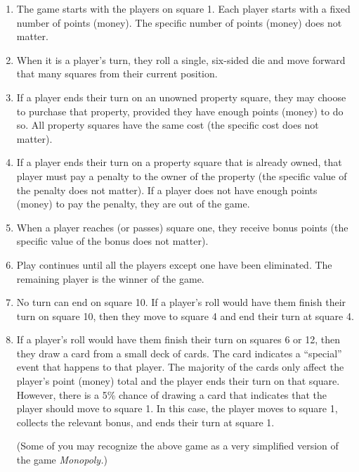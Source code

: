 \documentclass[fleqn]{article}
\begin{document}
\begin{enumerate}[nolistsep]
		\begin{enumerate}
			\item The game starts with the players on square 1. Each player starts with a fixed number of points (money). The specific number of points (money) does not matter.
			
			\item When it is a player’s turn, they roll a single, six-sided die and move forward that many squares from their current position.

			\item If a player ends their turn on an unowned property square, they may choose to purchase that property, provided they have enough points (money) to do so. All property squares have the same cost (the specific cost does not matter).

			\item If a player ends their turn on a property square that is already owned, that player must pay a penalty to the owner of the property (the specific value of the penalty does not matter). If a player does not have enough points (money) to pay the penalty, they are out of the game.
			
			\item When a player reaches (or passes) square one, they receive bonus points (the specific value of the bonus does not matter).

			\item Play continues until all the players except one have been eliminated. The remaining player is the winner of the game.

			\item No turn can end on square 10. If a player’s roll would have them finish their turn on square 10, then they move to square 4 and end their turn at square 4.

			\item If a player’s roll would have them finish their turn on squares 6 or 12, then they draw a card from a small deck of cards. The card indicates a “special” event that happens to that player. The majority of the cards only affect the player’s point (money) total and the player ends their turn on that square. However, there is a 5\% chance of drawing a card that indicates that the player should move to square 1. In this case, the player moves to square 1, collects the relevant bonus, and ends their turn at square 1.

			(Some of you may recognize the above game as a very simplified version of the game \textit{Monopoly.})


\end{enumerate}
\end{enumerate}
\end{document}
